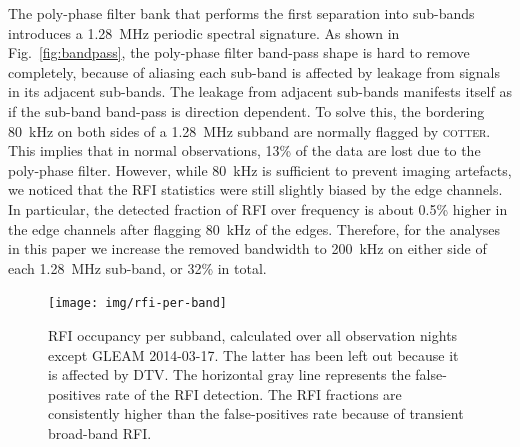 \documentclass{pasa}
\newcommand{\editmark}[1]{{\color{red}{\textbf{#1}}}}
\begin{document}
The poly-phase filter bank that performs the first separation into sub-bands introduces a 1.28~MHz periodic spectral signature. As shown in Fig.~\ref{fig:bandpass}, the poly-phase filter band-pass shape is hard to remove completely, because of aliasing each sub-band is affected by leakage from signals in its adjacent sub-bands. The leakage from adjacent sub-bands manifests itself as if the sub-band band-pass is direction dependent. To solve this, the bordering 80~kHz on both sides of a 1.28~MHz subband are normally flagged by \textsc{cotter}. This implies that in normal observations, 13\% of the data are lost due to the poly-phase filter. However, while 80~kHz is sufficient to prevent imaging artefacts, we noticed that the RFI statistics were still slightly biased by the edge channels. In particular, the detected fraction of RFI over frequency is about 0.5\% higher \editmark{(i.e., $\sim1.5\%$ instead of $\sim1\%$)} in the edge channels after flagging 80~kHz of the edges. Therefore, for the analyses in this paper we increase the removed bandwidth to 200~kHz on either side of each 1.28~MHz sub-band, or 32\% in total.
\noindent\begin{figure}
\begin{center}\hspace*{-0.2cm}\texttt{[image: img/rfi-per-band]}
\caption{RFI occupancy per subband, calculated over all observation nights except GLEAM 2014-03-17. The latter has been left out because it is affected by DTV. The horizontal gray line represents the false-positives rate of the RFI detection. The RFI fractions are consistently higher than the false-positives rate because of transient broad-band RFI.}
\label{fig:rfi-per-band}
\end{center}
\end{figure}
\end{document}
